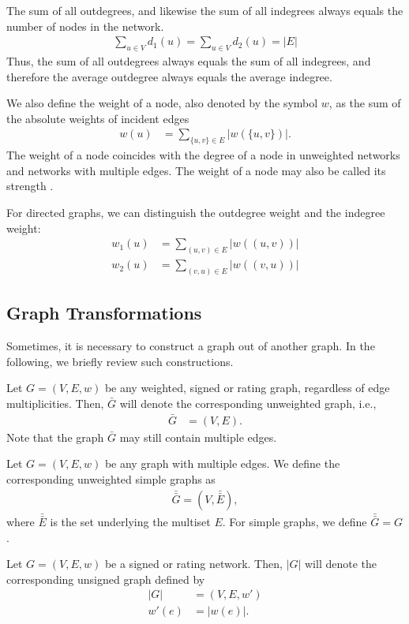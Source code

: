 \documentclass{article}
\begin{document}
The sum of all outdegrees, and likewise the sum of all indegrees always
equals the number of nodes in the network.  
\begin{align}
  \sum_{u\in V} d_1(u) = \sum_{u \in V} d_2(u) = |E|
\end{align}
Thus, the sum of all outdegrees always equals the sum of all indegrees,
and therefore the average outdegree always equals the average indegree.  

We also define the weight of a node, also denoted by the symbol $w$, as
the sum of the absolute weights of incident edges
\begin{align}
  w(u) &= \sum_{ \{u,v\} \in E} |w(\{u,v\})|. 
\end{align}
The weight of a node coincides with the degree of a node in unweighted
networks and networks with multiple edges. 
The weight of a node may also be called its strength \citep{b792}. 

For directed graphs, we can distinguish the outdegree weight and the
indegree weight:
\begin{align}
  w_1(u) &= \sum_{(u,v)\in E} |w((u,v))| \\
  w_2(u) &= \sum_{(v,u)\in E} |w((v,u))| 
\end{align}

\subsection{Graph Transformations}
Sometimes, it is necessary to construct a graph out of another graph.
In the following, we briefly review such constructions.  

Let $G=(V,E,w)$ be any weighted, signed or rating graph, regardless of
edge multiplicities.  Then, $\bar G$ will denote the corresponding
unweighted graph, i.e.,
\begin{align}
  \bar G &= (V,E).
\end{align}
Note that the graph $\bar G$ may still contain multiple edges. 

Let $G=(V,E,w)$ be any graph with multiple edges.  We define the
corresponding unweighted simple graphs as
\begin{align}
  \bar{\bar{G}} = (V, \bar{\bar E}),
\end{align}
where $\bar{\bar E}$ is the set underlying the multiset $E$. For simple
graphs, we define $\bar{\bar G} = G$. 

Let $G=(V,E,w)$ be a signed or rating network.  Then, $|G|$ will denote
the corresponding unsigned graph defined by
\begin{align}
  |G| &= (V,E, w') \\
  w'(e) &= |w(e)|. \nonumber
\end{align}
\end{document}
